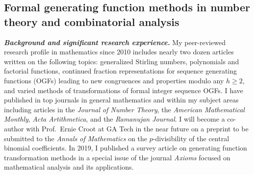 \documentclass[10pt,reqno,letterpaper]{article}
\theoremstyle{plain}
\numberwithin{theorem}{section}
\theoremstyle{definition}
\begin{document}
\subsection{Formal generating function methods in number theory and combinatorial analysis}

\vskip -0.5mm
\noindent
{\normalsize \textbf{\emph{Background and significant research experience.}}} 
My peer-reviewed research profile in mathematics since 2010 includes nearly two 
dozen articles written on the 
following topics: generalized Stirling numbers, polynomials and factorial functions, 
continued fraction representations for sequence generating functions (OGFs) leading to 
new congruences and properties modulo any $h \geq 2$, 
and varied methods of transformations of formal integer sequence OGFs.  
I have published in top journals in general mathematics and within my subject 
areas including articles in the \emph{Journal of Number Theory}, 
the \emph{American Mathematical Monthly}, \emph{Acta Artithmetica}, and the 
\emph{Ramanujan Journal}. 
I will become a co-author with 
Prof.~Ernie Croot at GA Tech in the near future on a preprint to be submitted to the 
\emph{Annals of Mathematics} on the $p$-divisibility of the 
central binomial coefficients. 
In 2019, I published a survey article on 
generating function transformation methods 
in a special issue of the journal \emph{Axioms} focused on 
mathematical analysis and its applications. 
\end{document}
